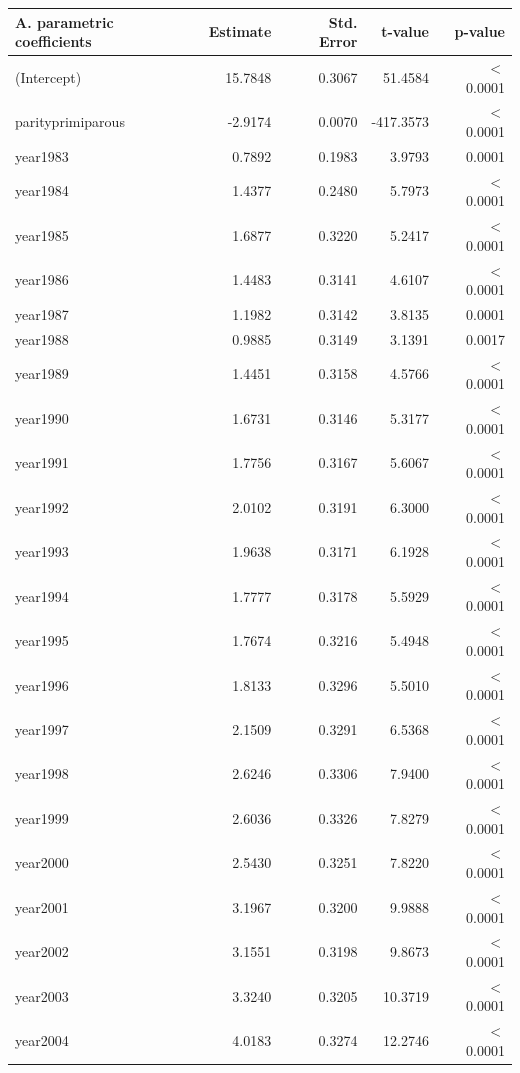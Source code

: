     \begin{table}[H]
    \centering
    \begin{tabular}{lrrrr}
    \textbf{A. parametric coefficients} & Estimate & Std. Error & t-value & p-value \\ 
       \hline
       \hline
      (Intercept) & 15.7848 & 0.3067 & 51.4584 & $<$ 0.0001 \\ 
      parityprimiparous & -2.9174 & 0.0070 & -417.3573 & $<$ 0.0001 \\ 
      year1983 & 0.7892 & 0.1983 & 3.9793 & 0.0001 \\ 
      year1984 & 1.4377 & 0.2480 & 5.7973 & $<$ 0.0001 \\ 
      year1985 & 1.6877 & 0.3220 & 5.2417 & $<$ 0.0001 \\ 
      year1986 & 1.4483 & 0.3141 & 4.6107 & $<$ 0.0001 \\ 
      year1987 & 1.1982 & 0.3142 & 3.8135 & 0.0001 \\ 
      year1988 & 0.9885 & 0.3149 & 3.1391 & 0.0017 \\ 
      year1989 & 1.4451 & 0.3158 & 4.5766 & $<$ 0.0001 \\ 
      year1990 & 1.6731 & 0.3146 & 5.3177 & $<$ 0.0001 \\ 
      year1991 & 1.7756 & 0.3167 & 5.6067 & $<$ 0.0001 \\ 
      year1992 & 2.0102 & 0.3191 & 6.3000 & $<$ 0.0001 \\ 
      year1993 & 1.9638 & 0.3171 & 6.1928 & $<$ 0.0001 \\ 
      year1994 & 1.7777 & 0.3178 & 5.5929 & $<$ 0.0001 \\ 
      year1995 & 1.7674 & 0.3216 & 5.4948 & $<$ 0.0001 \\ 
      year1996 & 1.8133 & 0.3296 & 5.5010 & $<$ 0.0001 \\ 
      year1997 & 2.1509 & 0.3291 & 6.5368 & $<$ 0.0001 \\ 
      year1998 & 2.6246 & 0.3306 & 7.9400 & $<$ 0.0001 \\ 
      year1999 & 2.6036 & 0.3326 & 7.8279 & $<$ 0.0001 \\ 
      year2000 & 2.5430 & 0.3251 & 7.8220 & $<$ 0.0001 \\ 
      year2001 & 3.1967 & 0.3200 & 9.9888 & $<$ 0.0001 \\ 
      year2002 & 3.1551 & 0.3198 & 9.8673 & $<$ 0.0001 \\ 
      year2003 & 3.3240 & 0.3205 & 10.3719 & $<$ 0.0001 \\ 
      year2004 & 4.0183 & 0.3274 & 12.2746 & $<$ 0.0001 \\ 

\end{tabular}
\end{table}
